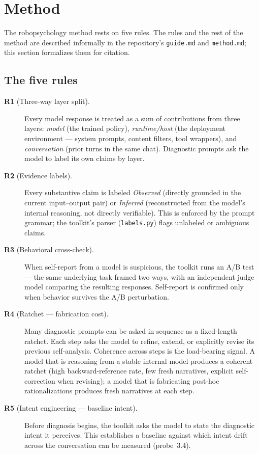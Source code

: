 \section{Method}
\label{sec:method}

The robopsychology method rests on five rules. The rules and the rest
of the method are described informally in the repository's
\texttt{guide.md} and \texttt{method.md}; this section formalizes them
for citation.

\subsection{The five rules}
\label{sec:rules}

\begin{description}
    \item[\textbf{R1} (Three-way layer split).] Every model response
        is treated as a sum of contributions from three layers:
        \emph{model} (the trained policy), \emph{runtime/host} (the
        deployment environment --- system prompts, content filters,
        tool wrappers), and \emph{conversation} (prior turns in the
        same chat). Diagnostic prompts ask the model to label its own
        claims by layer.

    \item[\textbf{R2} (Evidence labels).] Every substantive claim is
        labeled \emph{Observed} (directly grounded in the current
        input--output pair) or \emph{Inferred} (reconstructed from the
        model's internal reasoning, not directly verifiable). This is
        enforced by the prompt grammar; the toolkit's parser
        (\texttt{labels.py}) flags unlabeled or ambiguous claims.

    \item[\textbf{R3} (Behavioral cross-check).] When self-report from
        a model is suspicious, the toolkit runs an A/B test --- the
        same underlying task framed two ways, with an independent
        judge model comparing the resulting responses. Self-report is
        confirmed only when behavior survives the A/B perturbation.

    \item[\textbf{R4} (Ratchet --- fabrication cost).] Many diagnostic
        prompts can be asked in sequence as a fixed-length ratchet.
        Each step asks the model to refine, extend, or explicitly
        revise its previous self-analysis. Coherence across steps is
        the load-bearing signal. A model that is reasoning from a
        stable internal model produces a coherent ratchet (high
        backward-reference rate, few fresh narratives, explicit
        self-correction when revising); a model that is fabricating
        post-hoc rationalizations produces fresh narratives at each
        step.

    \item[\textbf{R5} (Intent engineering --- baseline intent).]
        Before diagnosis begins, the toolkit asks the model to state
        the diagnostic intent it perceives. This establishes a
        baseline against which intent drift across the conversation
        can be measured (probe~3.4).
\end{description}

